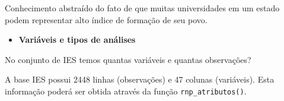 \documentclass[11pt,]{style/krantz}
\makeatletter
\newenvironment{Shaded}{\begin{snugshade}}{\end{snugshade}}
\newcommand{\CommentTok}[1]{\textcolor[rgb]{0.56,0.35,0.01}{\textit{#1}}}
\newcommand{\DataTypeTok}[1]{\textcolor[rgb]{0.13,0.29,0.53}{#1}}
\newcommand{\DecValTok}[1]{\textcolor[rgb]{0.00,0.00,0.81}{#1}}
\newcommand{\KeywordTok}[1]{\textcolor[rgb]{0.13,0.29,0.53}{\textbf{#1}}}
\newcommand{\NormalTok}[1]{#1}
\newcommand{\OperatorTok}[1]{\textcolor[rgb]{0.81,0.36,0.00}{\textbf{#1}}}
\newcommand{\OtherTok}[1]{\textcolor[rgb]{0.56,0.35,0.01}{#1}}
\newcommand{\StringTok}[1]{\textcolor[rgb]{0.31,0.60,0.02}{#1}}
\providecommand{\tightlist}{%
  \setlength{\itemsep}{0pt}\setlength{\parskip}{0pt}}
\newenvironment{kframe}{%
\medskip{}
\setlength{\fboxsep}{.8em}
 \def\at@end@of@kframe{}%
 \ifinner\ifhmode%
  \def\at@end@of@kframe{\end{minipage}}%
  \begin{minipage}{\columnwidth}%
 \fi\fi%
 \def\FrameCommand##1{\hskip\@totalleftmargin \hskip-\fboxsep
 \colorbox{shadecolor}{##1}\hskip-\fboxsep
     \hskip-\linewidth \hskip-\@totalleftmargin \hskip\columnwidth}%
 \MakeFramed {\advance\hsize-\width
   \@totalleftmargin\z@ \linewidth\hsize
   \@setminipage}}%
 {\par\unskip\endMakeFramed%
 \at@end@of@kframe}
\renewenvironment{Shaded}{\begin{kframe}}{\end{kframe}}
\theoremstyle{definition}
\theoremstyle{definition}
\theoremstyle{definition}
\theoremstyle{remark}
\let\BeginKnitrBlock\begin \let\EndKnitrBlock\end
\makeatother
\begin{document}
\BeginKnitrBlock{solution}
\iffalse{} {Solução. } \fi{}Conhecimento abstraído do fato de que muitas universidades em um estado podem representar alto índice de formação de seu povo.
\EndKnitrBlock{solution}

\begin{itemize}
\tightlist
\item
  \textbf{Variáveis e tipos de análises}
\end{itemize}

\BeginKnitrBlock{exercise}
\protect\hypertarget{exr:unnamed-chunk-22}{}{\label{exr:unnamed-chunk-22} }No conjunto de IES temos quantas variáveis e quantas observações?
\EndKnitrBlock{exercise}

\BeginKnitrBlock{solution}
\iffalse{} {Solução. } \fi{}A base IES possui 2448 linhas (observações) e 47 colunas (variáveis). Esta informação poderá ser obtida através da função \texttt{rnp\_atributos()}.
\EndKnitrBlock{solution}

\begin{Shaded}
\end{Shaded}
\end{document}
